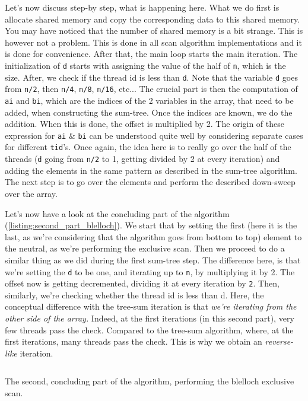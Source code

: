 Let's now discuss step-by step, what is happening here. What we do first is allocate shared memory and copy the corresponding 
data to this shared memory. You may have noticed that the number of shared memory is a bit strange. This is however not a 
problem. This is done in all scan algorithm implementations and it is done for convenience. After that, the main loop 
starts the main iteration. The initialization of \verb|d| starts with assigning the value of the half of \verb|n|, which is the size.
After, we check if the thread id is less than \verb|d|. Note that the variable \verb|d| goes from \verb|n/2|, then \verb|n/4|, 
\verb|n/8|, \verb|n/16|, etc... The crucial part is then the computation of \verb|ai| and \verb|bi|, which are the indices of the 2 
variables in the array, that need to be added, when constructing the sum-tree. Once the indices are known, we do the
addition. When this is done, the offset is multiplied by 2. The origin of these 
expression for \verb|ai| \& \verb|bi| can be understood quite well by considering 
separate cases for different \verb|tid|'s. Once again, the idea here is to really go 
over the half of the threads (\verb|d| going from \verb|n/2| to 1, getting divided 
by 2 at every iteration) and adding the elements in the same pattern as described in the 
sum-tree algorithm. The next step is to go over the elements and perform the described 
down-sweep over the array. 



Let's now have a look at the concluding part of the algorithm (\autoref{listing:second_part_blelloch}). We start that by setting the first (here it is the last, as we're 
considering that the algorithm goes from bottom to top) element to the neutral, as we're performing the exclusive scan. Then we 
proceed to do a similar thing as we did during the first sum-tree step. The difference here, is that we're setting the 
\verb|d| to be one, and iterating up to \verb|n|, by multiplying it by 2. The offset now is getting 
decremented, dividing it at every iteration by \verb|2|. Then, similarly, we're checking whether the thread id is less than 
d. Here, the conceptual difference with the tree-sum iteration is that \textsl{we're iterating from the other side of the array.} 
Indeed, at the first iterations (in this second part), very few threads pass the check. Compared to the tree-sum algorithm, where, at the first iterations, many 
threads pass the check. This is why we obtain an \textit{reverse-like} iteration.

\begin{listing}[ht!]
\inputminted[frame=single, framesep=1mm, linenos=true]{cuda}{cucodes/blelloch_end.cu}
\caption{The second, concluding part of the algorithm, performing the blelloch exclusive scan.}
\label{listing:second_part_blelloch}
\end{listing}

